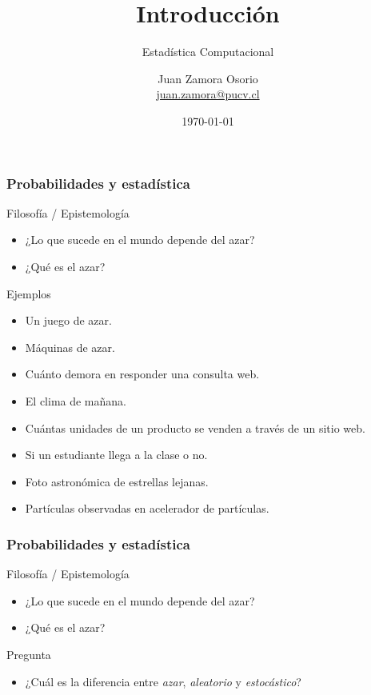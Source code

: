 \documentclass[table]{beamer}
\title{Introducción}
\subtitle{Estadística Computacional}
\author[J.Z.O-2023]{Juan Zamora Osorio\\\url{juan.zamora@pucv.cl}}
\institute[PUCV]{Instituto de Estadística\\Pontificia Universidad Cat\'olica de Valpara\'iso}
\date{\today}
\begin{document}
\frame{\titlepage}




\begin{frame}
    \frametitle{Probabilidades y estadística}
    \begin{block}{Filosofía / Epistemología}
        \begin{itemize}
            \item ¿Lo que sucede en el mundo depende del azar?
            \item ¿Qué es el azar?
        \end{itemize}
    \end{block}
    \begin{exampleblock}{Ejemplos}
        \begin{itemize}
            \item Un juego de azar.
            \item Máquinas de azar.
            \item Cuánto demora en responder una consulta web.
            \item El clima de mañana.
            \item Cuántas unidades de un producto se venden a través de un sitio web.
            \item Si un estudiante llega a la clase o no.
            \item Foto astronómica de estrellas lejanas.
            \item Partículas observadas en acelerador de partículas.
        \end{itemize}
    \end{exampleblock}
\end{frame}

\begin{frame}
    \frametitle{Probabilidades y estadística}
    \begin{block}{Filosofía / Epistemología}
        \begin{itemize}
            \item ¿Lo que sucede en el mundo depende del azar?
            \item ¿Qué es el azar?
        \end{itemize}
    \end{block}
    \begin{alertblock}{Pregunta}
        \begin{itemize}
            \item ¿Cuál es la diferencia entre \emph{azar}, \emph{aleatorio} y \emph{estocástico}?
        \end{itemize}
    \end{alertblock}
\end{frame}
\end{document}
